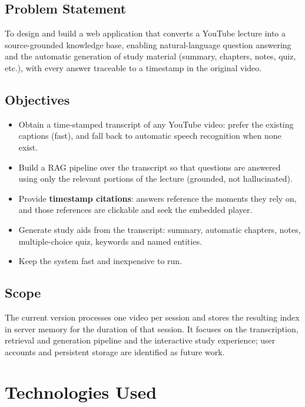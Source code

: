 \documentclass[11pt,a4paper]{article}
\begin{document}
\subsection{Problem Statement}
To design and build a web application that converts a YouTube lecture into a
source-grounded knowledge base, enabling natural-language question answering and the
automatic generation of study material (summary, chapters, notes, quiz, etc.), with every
answer traceable to a timestamp in the original video.

\subsection{Objectives}
\begin{itemize}[leftmargin=1.4em]
  \item Obtain a time-stamped transcript of any YouTube video: prefer the existing
        captions (fast), and fall back to automatic speech recognition when none exist.
  \item Build a RAG pipeline over the transcript so that questions are answered using
        only the relevant portions of the lecture (grounded, not hallucinated).
  \item Provide \textbf{timestamp citations}: answers reference the moments they rely on,
        and those references are clickable and seek the embedded player.
  \item Generate study aids from the transcript: summary, automatic chapters, notes,
        multiple-choice quiz, keywords and named entities.
  \item Keep the system fast and inexpensive to run.
\end{itemize}

\subsection{Scope}
The current version processes one video per session and stores the resulting index in
server memory for the duration of that session. It focuses on the transcription,
retrieval and generation pipeline and the interactive study experience; user accounts and
persistent storage are identified as future work.

\section{Technologies Used}
\end{document}
